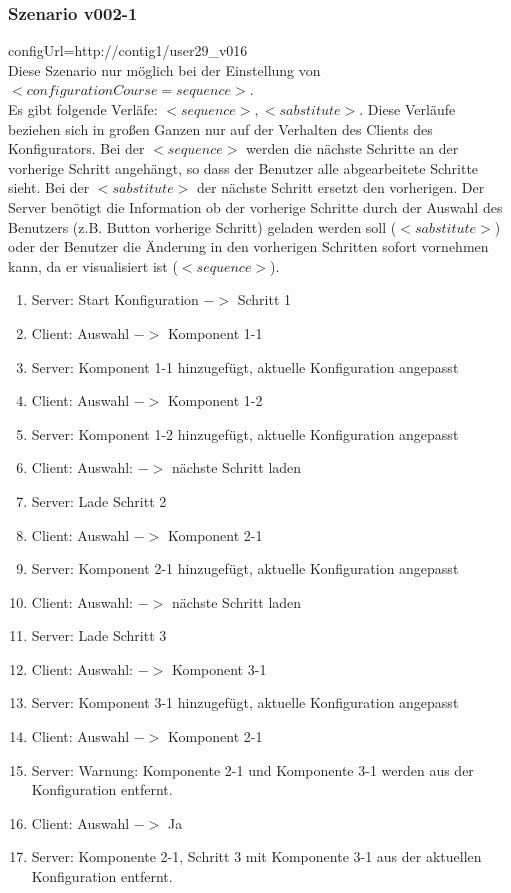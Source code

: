 \documentclass{article}
\begin{document}
\subsubsection{Szenario v002-1}

configUrl=http://contig1/user29\_v016\\

Diese Szenario nur m\"oglich bei der Einstellung von
$<configurationCourse=sequence>$.\\

\noindent Es gibt folgende Verläfe: $<sequence>, <sabstitute>$. 
Diese Verläufe beziehen sich in großen Ganzen nur auf der Verhalten des Clients des Konfigurators.
Bei der $<sequence>$ werden die nächste Schritte an der vorherige Schritt angehängt, 
so dass der Benutzer alle abgearbeitete Schritte sieht. Bei der $<sabstitute>$ der 
nächste Schritt ersetzt den vorherigen. Der Server benötigt die Information ob der 
vorherige Schritte durch der Auswahl des Benutzers (z.B. Button vorherige Schritt) geladen 
werden soll ($<sabstitute>$) oder der Benutzer die Änderung in den vorherigen Schritten 
sofort vornehmen kann, da er visualisiert ist ($<sequence>$). 

\begin{enumerate}
  \item Server: Start Konfiguration $->$ Schritt 1
  \item Client: Auswahl $->$ Komponent 1-1
  \item Server: Komponent 1-1 hinzugef\"ugt, aktuelle Konfiguration angepasst
  \item Client: Auswahl $->$ Komponent 1-2
  \item Server: Komponent 1-2 hinzugef\"ugt, aktuelle Konfiguration angepasst
  \item Client: Auswahl: $->$ n\"achste Schritt laden
  \item Server: Lade Schritt 2
  \item Client: Auswahl $->$ Komponent 2-1
  \item Server: Komponent 2-1 hinzugef\"ugt, aktuelle Konfiguration angepasst
  \item Client: Auswahl: $->$ n\"achste Schritt laden
  \item Server: Lade Schritt 3
  \item Client: Auswahl: $->$ Komponent 3-1
  \item Server: Komponent 3-1 hinzugef\"ugt, aktuelle Konfiguration angepasst
  \item Client: Auswahl $->$ Komponent 2-1
  \item Server: Warnung: Komponente 2-1 und Komponente 3-1 werden aus der
  Konfiguration entfernt.
  \item Client: Auswahl $->$ Ja
  \item Server: Komponente 2-1, Schritt 3 mit Komponente 3-1 aus der aktuellen
  Konfiguration entfernt.
\end{enumerate}
\end{document}
